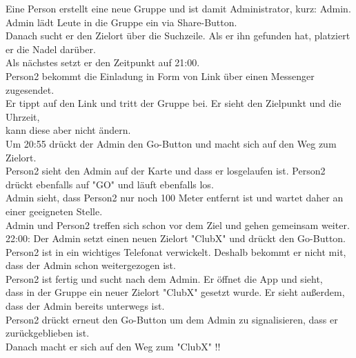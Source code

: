      Eine Person erstellt eine neue Gruppe und ist damit Administrator, kurz: Admin.\\
     Admin lädt Leute in die Gruppe ein via Share-Button. \\
     Danach sucht er den Zielort über die Suchzeile. Als er ihn gefunden hat, platziert er die Nadel darüber.\\
     Als nächstes setzt er den Zeitpunkt auf 21:00.\\
     Person2 bekommt die Einladung in Form von Link über einen Messenger zugesendet.\\
     Er tippt auf den Link und tritt der Gruppe bei. Er sieht den Zielpunkt und die Uhrzeit,\\
     kann diese aber nicht ändern.\\
     Um 20:55 drückt der Admin den Go-Button und macht sich auf den Weg zum Zielort.\\
     Person2 sieht den Admin auf der Karte und dass er losgelaufen ist. Person2 drückt ebenfalls auf "GO" und läuft ebenfalls los.\\
     Admin sieht, dass Person2 nur noch 100 Meter entfernt ist und wartet daher an einer geeigneten Stelle.\\
     Admin und Person2 treffen sich schon vor dem Ziel und gehen gemeinsam weiter.\\
     22:00: Der Admin setzt einen neuen Zielort "ClubX" und drückt den Go-Button.\\
     Person2 ist in ein wichtiges Telefonat verwickelt. Deshalb bekommt er nicht mit,\\
     dass der Admin schon weitergezogen ist.\\
     Person2 ist fertig und sucht nach dem Admin. Er öffnet die App und sieht, \\
     dass in der Gruppe ein neuer Zielort "ClubX" gesetzt wurde. Er sieht außerdem, dass der Admin bereits unterwegs ist.\\
     Person2 drückt erneut den Go-Button um dem Admin zu signalisieren, dass er zurückgeblieben ist.\\
     Danach macht er sich auf den Weg zum "ClubX" !!\\
